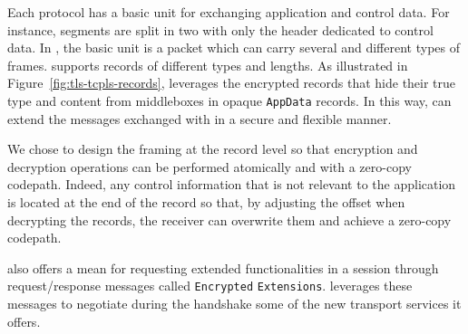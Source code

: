 Each protocol has a basic unit for exchanging application and control data.
For instance, \tcp segments are split in two with only the header dedicated to 
control data. In \quic, the basic unit is a \quic packet which can carry 
several and different types of \quic frames. \tls supports \tls records of 
different types and lengths.  As illustrated in 
Figure~\ref{fig:tls-tcpls-records}, \tcpls leverages the \tls encrypted records 
that hide their true type and content from middleboxes in opaque 
\texttt{AppData} records. In this way, \tcpls can extend the messages exchanged 
with \tls in a secure and flexible manner.

We chose to design the \tcpls framing at the \tls record level so that
encryption and decryption operations can be performed atomically and with
a zero-copy codepath. Indeed, any \tcpls control information that is not relevant to the application is
located at the end of the record so that, by adjusting the offset when
decrypting the \tcpls records, the receiver can overwrite them and achieve a zero-copy codepath.


\tls also offers a mean for requesting extended functionalities in a \tls
session through request/response messages called \tls \texttt{Encrypted}
\texttt{Extensions}.
\tcpls leverages these messages to negotiate during the handshake some of the 
new transport services it offers.

